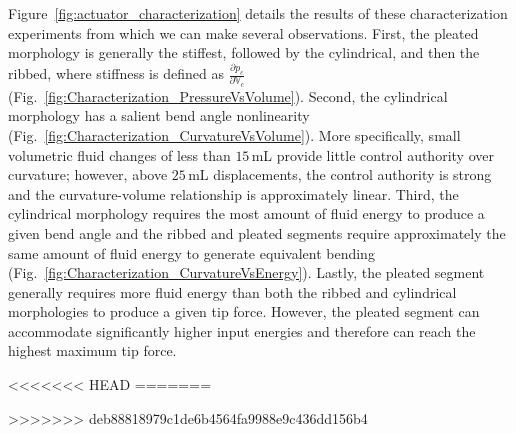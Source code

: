 Figure~\ref{fig:actuator_characterization} details the results of these characterization experiments from which we can make several observations.
%
First, the pleated morphology is generally the stiffest, followed by the cylindrical, and then the ribbed, where stiffness is defined as $\frac{\partial p_c}{\partial \mathbb{V}_c}$ (Fig.~\ref{fig:Characterization_PressureVsVolume}).
%
Second, the cylindrical morphology has a salient bend angle nonlinearity (Fig.~\ref{fig:Characterization_CurvatureVsVolume}).
%
More specifically, small volumetric fluid changes of less than $15\,$mL provide little control authority over curvature; however, above $25\,$mL displacements, the control authority is strong and the curvature-volume relationship is approximately linear.
%
Third, the cylindrical morphology requires the most amount of fluid energy to produce a given bend angle and the ribbed and pleated segments require approximately the same amount of fluid energy to generate equivalent bending (Fig.~\ref{fig:Characterization_CurvatureVsEnergy}).
%
Lastly, the pleated segment generally requires more fluid energy than both the ribbed and cylindrical morphologies to produce a given tip force.
%
However, the pleated segment can accommodate significantly higher input energies and therefore can reach the highest maximum tip force.
%

<<<<<<< HEAD
=======

 
>>>>>>> deb88818979c1de6b4564fa9988e9c436dd156b4
